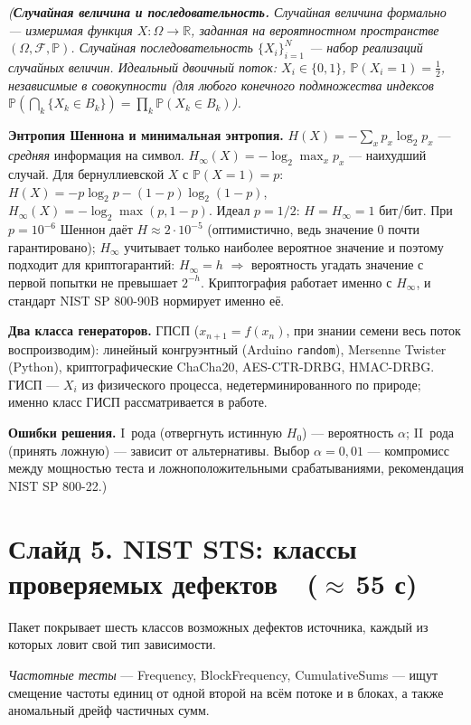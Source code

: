 \documentclass[12pt,a4paper]{extarticle}
\newcommand{\note}[1]{%
  \par
  {\small\color{noteclr}\itshape (#1)}%
  \par}
\begin{document}
\note{\textbf{Случайная величина и последовательность.}
Случайная величина формально --- измеримая функция
$X:\Omega\to\mathbb{R}$, заданная на вероятностном пространстве
$(\Omega,\mathcal{F},\mathbb{P})$. Случайная последовательность
$\{X_i\}_{i=1}^N$ --- набор реализаций случайных величин. Идеальный двоичный
поток: $X_i\in\{0,1\}$, $\mathbb{P}(X_i{=}1)=\tfrac12$, независимые в
совокупности (для любого конечного подмножества индексов
$\mathbb{P}(\bigcap_k\{X_k\in B_k\})=\prod_k\mathbb{P}(X_k\in B_k)$).

\medskip
\textbf{Энтропия Шеннона и минимальная энтропия.}
$H(X) = -\sum_x p_x \log_2 p_x$ --- \emph{средняя} информация на символ.
$H_\infty(X) = -\log_2 \max_x p_x$ --- наихудший случай.
Для бернуллиевской $X$ с $\mathbb{P}(X{=}1)=p$:
$H(X) = -p\log_2 p - (1-p)\log_2(1-p)$, $H_\infty(X) = -\log_2\max(p,1-p)$.
Идеал $p = 1/2$: $H = H_\infty = 1$ бит/бит. При $p = 10^{-6}$ Шеннон даёт
$H \approx 2\cdot 10^{-5}$ (оптимистично, ведь значение $0$ почти
гарантировано); $H_\infty$ учитывает только наиболее вероятное значение и
поэтому подходит для криптогарантий: $H_\infty = h$ $\Rightarrow$ вероятность
угадать значение с первой попытки не превышает $2^{-h}$. Криптография работает
именно с $H_\infty$, и стандарт NIST SP 800-90B нормирует именно её.

\medskip
\textbf{Два класса генераторов.} ГПСП ($x_{n+1}=f(x_n)$, при знании семени
весь поток воспроизводим): линейный конгруэнтный (Arduino \texttt{random}),
Mersenne Twister (Python), криптографические ChaCha20, AES-CTR-DRBG,
HMAC-DRBG. ГИСП --- $X_i$ из физического процесса, недетерминированного по
природе; именно класс ГИСП рассматривается в работе.

\medskip
\textbf{Ошибки решения.} I~рода (отвергнуть истинную $H_0$) --- вероятность
$\alpha$; II~рода (принять ложную) --- зависит от альтернативы. Выбор
$\alpha=0{,}01$ --- компромисс между мощностью теста и ложноположительными
срабатываниями, рекомендация NIST SP 800-22.}

\section*{Слайд 5. NIST STS: классы проверяемых дефектов~~($\approx$\,55 с)}

Пакет покрывает шесть классов возможных дефектов источника, каждый из которых
ловит свой тип зависимости.

\emph{Частотные тесты} --- Frequency, BlockFrequency, CumulativeSums ---
ищут смещение частоты единиц от одной второй на всём потоке и в блоках,
а также аномальный дрейф частичных сумм.
\end{document}
